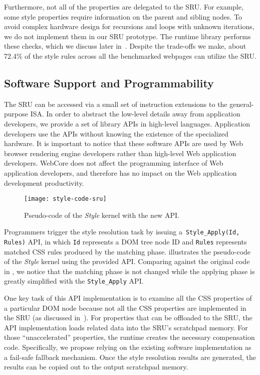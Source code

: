 Furthermore, not all of the properties are delegated to the SRU. For example, some style properties require information on the parent and sibling nodes. To avoid complex hardware design for recursions and loops with unknown iterations, we do not implement them in our SRU prototype. The runtime library performs these checks, which we discuss later in~. Despite the trade-offs we make, about 72.4\% of the style rules across all the benchmarked webpages can utilize the SRU.  

\subsection{Software Support and Programmability}
\label{sec:sru:sw}

The SRU can be accessed via a small set of instruction extensions to the general-purpose ISA. In order to abstract the low-level details away from application developers, we provide a set of library APIs in high-level languages. Application developers use the APIs without knowing the existence of the specialized hardware. It is important to notice that these software APIs are used by Web browser rendering engine developers rather than high-level Web application developers. WebCore does not affect the programming interface of Web application developers, and therefore has no impact on the Web application development productivity.

\begin{figure}[h]
\centering
\captionsetup{width=.8\columnwidth}
\texttt{[image: style-code-sru]}
\caption{Pseudo-code of the \textit{Style} kernel with the new API.}
\label{fig:style-code-sru}
\end{figure}

Programmers trigger the style resolution task by issuing a~\texttt{Style\_Apply(Id, Rules)} API, in which \texttt{Id} represents a DOM tree node ID and \texttt{Rules} represents matched CSS rules produced by the matching phase.  illustrates the pseudo-code of the \textit{Style} kernel using the provided API. Comparing against the original code in , we notice that the matching phase is not changed while the applying phase is greatly simplified with the \texttt{Style\_Apply} API.

One key task of this API implementation is to examine all the CSS properties of a particular DOM node because not all the CSS properties are implemented in the SRU (as discussed in~). For properties that can be offloaded to the SRU, the API implementation loads related data into the SRU's scratchpad memory. For those ``unaccelerated'' properties, the runtime creates the necessary compensation code. Specifically, we propose relying on the existing software implementation as a fail-safe fallback mechanism. Once the style resolution results are generated, the results can be copied out to the output scratchpad memory.

